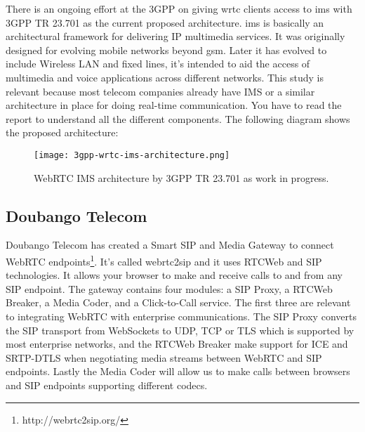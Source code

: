 There is an ongoing effort at the 3GPP on giving \gls{wrtc} clients access to \gls{ims} with 3GPP TR 23.701\cite{3gpp-wrtc-access-ims} as the current proposed architecture. \gls{ims} is basically an architectural framework for delivering IP multimedia services. It was originally designed for evolving mobile networks beyond \gls{gsm}. Later it has evolved to include Wireless LAN and fixed lines, it's intended to aid the access of multimedia and voice applications across different networks. This study is relevant because most telecom companies already have IMS or a similar architecture in place for doing real-time communication. You have to read the report\cite{3gpp-wrtc-access-ims} to understand all the different components. The following diagram shows the proposed architecture:

\begin{figure}[here]
\centerline{\texttt{[image: 3gpp-wrtc-ims-architecture.png]}}
\caption{WebRTC IMS architecture by 3GPP TR 23.701 as work in progress.}
\label{fig:wrtc-ims-architecture}
\end{figure}

\subsection{Doubango Telecom}
Doubango Telecom has created a Smart SIP and Media Gateway to connect WebRTC endpoints\footnote{http://webrtc2sip.org/}. It's called webrtc2sip and it uses RTCWeb and SIP technologies. It allows your browser to make and receive calls to and from any SIP endpoint. The gateway contains four modules: a SIP Proxy, a RTCWeb Breaker, a Media Coder, and a Click-to-Call service. The first three are relevant to integrating WebRTC with enterprise communications. The SIP Proxy converts the SIP transport from WebSockets to UDP, TCP or TLS which is supported by most enterprise networks, and the RTCWeb Breaker make support for ICE and SRTP-DTLS when negotiating media streams between WebRTC and SIP endpoints. Lastly the Media Coder will allow us to make calls between browsers and SIP endpoints supporting different codecs.